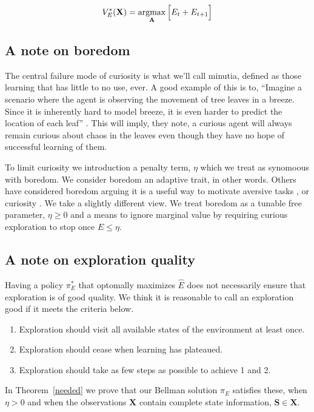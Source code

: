 \begin{equation}
	\label{eq:EE} 
	V_E^{*}(\mathbf{X}) = \operatorname*{argmax}_{\mathbf{A}} \Big [ E_t + E_{t+1} \Big ]
\end{equation}

\subsection{A note on boredom}
The central failure mode of curiosity is what we'll call minutia, defined as those learning that has little to no use, ever. A good example of this is to, ``Imagine a scenario where the agent is observing the movement of tree leaves in a breeze. Since it is inherently hard to model breeze, it is even harder to predict the location of each leaf'' \cite{Pathak2017}. This will imply, they note, a curious agent will always remain curious about chaos in the leaves even though they have no hope of successful learning of them.

To limit curiosity we introduction a penalty term, $\eta$ which we treat as synomoous with boredom. We consider boredom an adaptive trait, in other words. Others have considered boredom arguing it is a useful way to motivate aversive tasks \citep{Bench2013}, or curiosity \cite{Loewenstein1994}. We take a slightly different view. We treat boredom as a tunable free parameter, $\eta \ge 0$ and a means to ignore marginal value by requiring curious exploration to stop once $E \le \eta$. 


\subsection{A note on exploration quality}
Having a policy $\pi_E^*$ that optomally maximizes $\hat E$ does not necessarily ensure that exploration is of good quality. We think it is reasonable to call an exploration good if it meets the criteria below. 

\begin{enumerate}
	\item Exploration should visit all available states of the environment at least once.
	\item Exploration should cease when learning has plateaued.
	\item Exploration should take as few steps as possible to achieve 1 and 2.
\end{enumerate}

In Theorem~\ref{needed} we prove that our Bellman solution $\pi_E$ satisfies these, when $\eta > 0$ and when the observations $\mathbf{X}$ contain complete state information, $\mathbf{S} \in \mathbf{X}$. 

